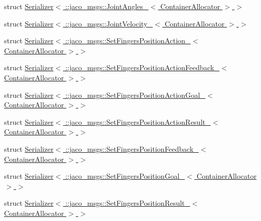 \begin{DoxyCompactItemize}
\item 
struct \hyperlink{structros_1_1serialization_1_1Serializer_3_01_1_1jaco__msgs_1_1JointAngles___3_01ContainerAllocator_01_4_01_4}{Serializer$<$ \+::jaco\+\_\+msgs\+::\+Joint\+Angles\+\_\+$<$ Container\+Allocator $>$ $>$}
\item 
struct \hyperlink{structros_1_1serialization_1_1Serializer_3_01_1_1jaco__msgs_1_1JointVelocity___3_01ContainerAllocator_01_4_01_4}{Serializer$<$ \+::jaco\+\_\+msgs\+::\+Joint\+Velocity\+\_\+$<$ Container\+Allocator $>$ $>$}
\item 
struct \hyperlink{structros_1_1serialization_1_1Serializer_3_01_1_1jaco__msgs_1_1SetFingersPositionAction___3_01ContainerAllocator_01_4_01_4}{Serializer$<$ \+::jaco\+\_\+msgs\+::\+Set\+Fingers\+Position\+Action\+\_\+$<$ Container\+Allocator $>$ $>$}
\item 
struct \hyperlink{structros_1_1serialization_1_1Serializer_3_01_1_1jaco__msgs_1_1SetFingersPositionActionFeedback_447d288d4cb72b1c92e396d90d0558f7}{Serializer$<$ \+::jaco\+\_\+msgs\+::\+Set\+Fingers\+Position\+Action\+Feedback\+\_\+$<$ Container\+Allocator $>$ $>$}
\item 
struct \hyperlink{structros_1_1serialization_1_1Serializer_3_01_1_1jaco__msgs_1_1SetFingersPositionActionGoal___3_01ContainerAllocator_01_4_01_4}{Serializer$<$ \+::jaco\+\_\+msgs\+::\+Set\+Fingers\+Position\+Action\+Goal\+\_\+$<$ Container\+Allocator $>$ $>$}
\item 
struct \hyperlink{structros_1_1serialization_1_1Serializer_3_01_1_1jaco__msgs_1_1SetFingersPositionActionResult___838e73897c4a86106fa5fb9dc69a0e18}{Serializer$<$ \+::jaco\+\_\+msgs\+::\+Set\+Fingers\+Position\+Action\+Result\+\_\+$<$ Container\+Allocator $>$ $>$}
\item 
struct \hyperlink{structros_1_1serialization_1_1Serializer_3_01_1_1jaco__msgs_1_1SetFingersPositionFeedback___3_01ContainerAllocator_01_4_01_4}{Serializer$<$ \+::jaco\+\_\+msgs\+::\+Set\+Fingers\+Position\+Feedback\+\_\+$<$ Container\+Allocator $>$ $>$}
\item 
struct \hyperlink{structros_1_1serialization_1_1Serializer_3_01_1_1jaco__msgs_1_1SetFingersPositionGoal___3_01ContainerAllocator_01_4_01_4}{Serializer$<$ \+::jaco\+\_\+msgs\+::\+Set\+Fingers\+Position\+Goal\+\_\+$<$ Container\+Allocator $>$ $>$}
\item 
struct \hyperlink{structros_1_1serialization_1_1Serializer_3_01_1_1jaco__msgs_1_1SetFingersPositionResult___3_01ContainerAllocator_01_4_01_4}{Serializer$<$ \+::jaco\+\_\+msgs\+::\+Set\+Fingers\+Position\+Result\+\_\+$<$ Container\+Allocator $>$ $>$}

\end{DoxyCompactItemize}
